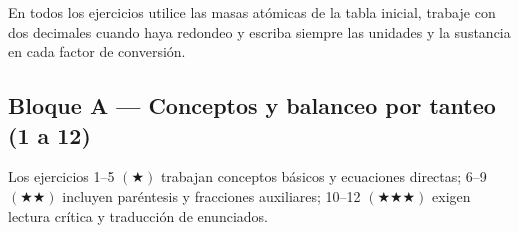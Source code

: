 \documentclass[12pt, letterpaper]{article}
\begin{document}
\noindent En todos los ejercicios utilice las masas atómicas de la tabla inicial, trabaje con dos decimales cuando haya redondeo y escriba siempre las unidades y la sustancia en cada factor de conversión.

\subsection{Bloque A — Conceptos y balanceo por tanteo (1 a 12)}

\noindent Los ejercicios 1--5 $(\bigstar)$ trabajan conceptos básicos y ecuaciones directas; 6--9 $(\bigstar\bigstar)$ incluyen paréntesis y fracciones auxiliares; 10--12 $(\bigstar\bigstar\bigstar)$ exigen lectura crítica y traducción de enunciados.
\end{document}
